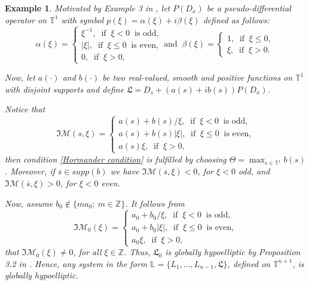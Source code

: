 \documentclass[12pt]{elsarticle}
\newtheorem{example}[theorem]{Example}
\numberwithin{equation}{section}
\begin{document}
\begin{example}\label{exe-hormander-cond}
Motivated by Example 3 in \cite{Avila}, 	let $P(D_x)$ be a pseudo-differential operator  on $\mathbb{T}^1$ with symbol $p(\xi) =\alpha(\xi) + i\beta(\xi)$ defined as follows:
	$$
	\alpha(\xi) = 
	\left\{
	\begin{array}{l}
	\xi^{-1}, \ \textrm{ if } \ \xi<0  \ \textrm{ is odd,} \\
	|\xi|, \ \textrm{ if } \ \xi \leq 0  \ \textrm{ is even,} \\
	0, \ \textrm{ if  } \ \xi > 0,
	\end{array}
	\right. 
	\ \textrm{and } \
	\beta(\xi) = 
	\left\{
	\begin{array}{l}
	1, \ \textrm{ if  } \ \xi \leq 0, \\
	\xi, \ \textrm{ if } \ \xi > 0.
	\end{array}
	\right. 
	$$
	
	
	Now, let $a(\cdot)$ and $b(\cdot)$ be two real-valued, smooth  and  positive functions on $\mathbb{T}^1$ with disjoint supports
	and define  $\mathfrak{L}= D_{s} + (a(s)+ ib(s))P(D_x)$. 
	
	Notice that	
	$$
	\Im \mathcal{M}(s,\xi) =
	\left\{
	\begin{array}{l}
	a(s) + {b(s)}/{\xi}, \ \textrm{ if } \ \xi<0  \ \textrm{ is odd,} \\
	a(s) + b(s)|\xi|, \ \textrm{ if } \ \xi \leq 0  \ \textrm{ is even,} \\
	a(s) \xi, \ \textrm{ if } \ \xi > 0,
	\end{array}
	\right.	
	$$
	then  condition \eqref{Hormander condition} is fulfilled by choosing 
	$\Theta = \max_{s \in \mathbb{T}^1} {b(s)}$. Moreover, if $\overline{s}\in supp(b)$ we have $\Im \mathcal{M}(\overline{s},\xi)<0$, for $\xi<0$ odd, and 
	$\Im \mathcal{M}(\overline{s},\xi)>0$, for $\xi<0$ even. 
	
	Now, assume $b_{0} \notin \{m a_{0}; \ m \in \mathbb{Z}\}$. It follows from
	$$
	\Im \mathcal{M}_{0}(\xi) =
	\left\{
	\begin{array}{l}
	a_{0} + {b_{0}}/{\xi}, \ \textrm{ if } \ \xi<0  \ \textrm{ is odd,} \\
	a_{0} + b_{0}|\xi|, \ \textrm{ if } \ \xi \leq 0  \ \textrm{ is even,} \\
	a_{0} \xi, \ \textrm{ if } \ \xi > 0,
	\end{array}
	\right.	
	$$
	that $\Im \mathcal{M}_{0}(\xi) \neq 0$, for all $\xi \in \mathbb{Z}$. Thus, $\mathfrak{L}_0$ is globally hypoelliptic by Proposition 3.2 in \cite{AGKM}. Hence,  any system in the form $\mathbb{L}=\{L_1, \ldots, L_{n-1},\mathfrak{L}\}$, defined on  $\mathbb{T}^{n+1}$, is globally hypoelliptic.
	
\end{example}
\end{document}
